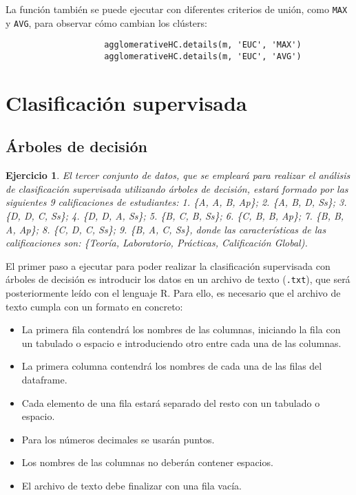 \documentclass[12pt]{report}\usepackage[]{graphicx}\usepackage[dvipsnames]{xcolor}
\newtheorem{exercise}{Ejercicio}[section]
\begin{document}
				La función también se puede ejecutar con diferentes criterios de unión, como \texttt{MAX} y \texttt{AVG}, para observar cómo cambian los clústers:
				
				\begin{verbatim}
					agglomerativeHC.details(m, 'EUC', 'MAX')
					agglomerativeHC.details(m, 'EUC', 'AVG')
				\end{verbatim}
		
		\section{Clasificación supervisada}
		
			\subsection{Árboles de decisión}
		
				\begin{exercise}
					El tercer conjunto de datos, que se empleará para realizar el análisis de clasificación supervisada utilizando árboles de decisión, estará formado por las siguientes 9 calificaciones de estudiantes: 1. \{A, A, B, Ap\}; 2. \{A, B, D, Ss\}; 3. \{D, D, C, Ss\}; 4. \{D, D, A, Ss\}; 5. \{B, C, B, Ss\}; 6. \{C, B, B, Ap\}; 7. \{B, B, A, Ap\}; 8. \{C, D, C, Ss\}; 9. \{B, A, C,
					Ss\}, donde las características de las calificaciones son: \{Teoría, Laboratorio, Prácticas, Calificación Global).
				\end{exercise}
				
				El primer paso a ejecutar para poder realizar la clasificación supervisada con árboles de decisión es introducir los datos en un archivo de texto (\texttt{.txt}), que será posteriormente leído con el lenguaje R. Para ello, es necesario que el archivo de texto cumpla con un formato en concreto:
				
				\begin{itemize}
					\item La primera fila contendrá los nombres de las columnas, iniciando la fila con un tabulado o espacio e introduciendo otro entre cada una de las columnas.
					\item La primera columna contendrá los nombres de cada una de las filas del dataframe.
					\item Cada elemento de una fila estará separado del resto con un tabulado o espacio.
					\item Para los números decimales se usarán puntos. 
					\item Los nombres de las columnas no deberán contener espacios. 
					\item El archivo de texto debe finalizar con una fila vacía.
				\end{itemize}
				
\end{document}
